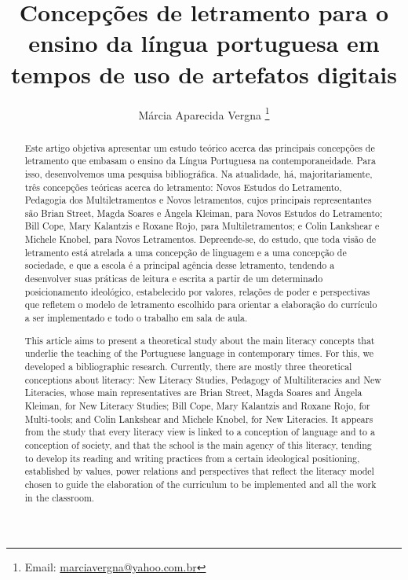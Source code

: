 \documentclass{textolivre}
\title{Concepções de letramento para o ensino da língua portuguesa em tempos de uso de artefatos digitais}
\author[1]{Márcia Aparecida Vergna \thanks{Email: \url{marciavergna@yahoo.com.br}}}
\affil[1]{Universidade Estácio de Sá, Brasil.}
\begin{document}
\maketitle

\begin{poliabstract}
\begin{abstract}
Este artigo objetiva apresentar um estudo teórico acerca das principais
concepções de letramento que embasam o ensino da Língua Portuguesa na
contemporaneidade. Para isso, desenvolvemos uma pesquisa bibliográfica. Na
atualidade, há, majoritariamente, três concepções teóricas acerca do
letramento: Novos Estudos do Letramento, Pedagogia dos Multiletramentos e Novos
letramentos, cujos principais representantes são Brian Street, Magda Soares e
Ângela Kleiman, para Novos Estudos do Letramento; Bill Cope, Mary Kalantzis e
Roxane Rojo, para Multiletramentos; e Colin Lankshear e Michele Knobel, para
Novos Letramentos. Depreende-se, do estudo, que toda visão de letramento está
atrelada a uma concepção de linguagem e a uma concepção de sociedade, e que a
escola é a principal agência desse letramento, tendendo a desenvolver suas
práticas de leitura e escrita a partir de um determinado posicionamento
ideológico, estabelecido por valores, relações de poder e perspectivas que
refletem o modelo de letramento escolhido para orientar a elaboração do
currículo a ser implementado e todo o trabalho em sala de aula.

\end{abstract}

\begin{english}
\begin{abstract}
This article aims to present a theoretical study about the main literacy
concepts that underlie the teaching of the Portuguese language in contemporary
times. For this, we developed a bibliographic research. Currently, there are
mostly three theoretical conceptions about literacy: New Literacy Studies,
Pedagogy of Multiliteracies and New Literacies, whose main representatives are
Brian Street, Magda Soares and Ângela Kleiman, for New Literacy Studies; Bill
Cope, Mary Kalantzis and Roxane Rojo, for Multi-tools; and Colin Lankshear and
Michele Knobel, for New Literacies. It appears from the study that every
literacy view is linked to a conception of language and to a conception of
society, and that the school is the main agency of this literacy, tending to
develop its reading and writing practices from a certain ideological
positioning, established by values, power relations and perspectives that
reflect the literacy model chosen to guide the elaboration of the curriculum to
be implemented and all the work in the classroom.

\end{abstract}
\end{english}

\end{poliabstract}
\end{document}

